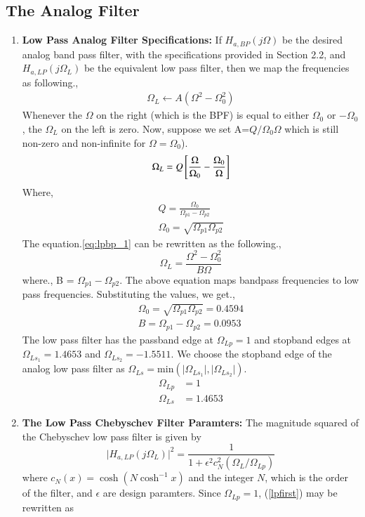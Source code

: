 \documentclass[journal,12pt,twocolumn]{IEEEtran}
\begin{document}
\subsection{The Analog Filter}
\begin{enumerate}

\item \textbf{Low Pass Analog Filter Specifications:}  If $H_{a, BP}(j\Omega)$ be the desired analog band
pass filter,  with the specifications provided in Section 2.2, and $H_{a,LP}(j\Omega_L)$ 
be the equivalent low pass filter, then we map the frequencies as following.,
\begin{align}
\Omega_L \xleftarrow{} A(\Omega^2 - \Omega_{0}^{2})
\end{align}
Whenever the $\Omega$ on the right (which is the BPF) is equal to either  $\Omega_0$ or $-\Omega_0$ , the $\Omega_{L}$ on the left is zero. 
Now, suppose we set A=$Q/\Omega_0 \Omega$ which is still non-zero and non-infinite for $\Omega=\Omega_0$).
\begin{align}
    \Omega_L = Q\sbrak{\frac{\Omega}{\Omega_0}-\frac{\Omega_0}{\Omega}} \label{eq:lpbp_1}
\end{align}
Where,
\begin{align}
    Q = \frac{\Omega_0}{\Omega_{p1} -\Omega_{p2}}\\
    \Omega_0 = \sqrt{\Omega_{p1} \Omega_{p2}}
\end{align}
The equation.\ref{eq:lpbp_1} can be rewritten as the following.,
\begin{equation}
\label{lpbp_2}
\Omega_L = \frac{\Omega^2 - \Omega_0^2}{B\Omega}
\end{equation}
where., B = $\Omega_{p1} -\Omega_{p2}$.
The above equation maps bandpass frequencies to low pass frequencies.
Substituting the values, we get.,
\begin{align}
\Omega_0 = \sqrt{\Omega_{p1}\Omega_{p2}} = 0.4594\\
B = \Omega_{p1} - \Omega_{p2} = 0.0953 
\end{align}
The low pass filter has
the passband edge at $\Omega_{Lp} = 1$ and stopband edges at $\Omega_{Ls_1} = 1.4653$ and $\Omega_{Ls_2} = -1.5511$.  We choose the stopband edge of the analog low pass filter as $\Omega_{Ls} = \mbox{min}(\vert \Omega_{Ls_1}\vert,\vert \Omega_{Ls_2}\vert)$.
\begin{align}
    \Omega_{Lp} &= 1\\
    \Omega_{Ls} &= 1.4653
\end{align}

\item \textbf{The Low Pass Chebyschev Filter Paramters:}  The magnitude squared of the Chebyschev low pass filter is given by 
\begin{equation}
\label{lpfirst}
\vert H_{a,LP}(j\Omega_L)\vert^2 = \frac{1}{1 + \epsilon^2c_N^2(\Omega_L/\Omega_{Lp})}
\end{equation}
where $c_N(x) = \cosh(N \cosh^{-1}x)$ and the integer $N$, which is the order of the filter, and $\epsilon$ are design paramters.  Since $\Omega_{Lp} = 1$, (\ref{lpfirst}) may be rewritten as


\end{enumerate}
\end{document}
